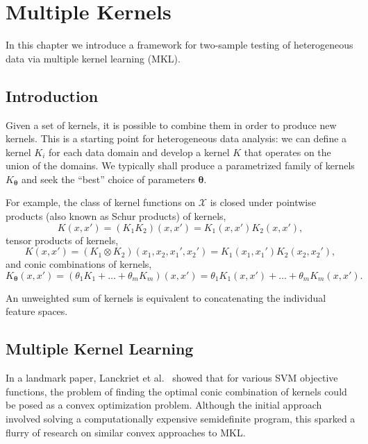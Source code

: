\graphicspath{{./MKL/img/}}
\chapter{Multiple Kernels}
\label{C:MKL}
In this chapter we introduce a framework for two-sample testing
of heterogeneous data via multiple kernel learning (MKL).

\section{Introduction}
Given a set of kernels, it is possible to combine them in order to produce new
kernels.  This is a starting point for heterogeneous data analysis: we
can define a kernel $K_i$ for each data domain and develop a kernel $K$ that operates
on the union of the domains.  We typically shall produce a parametrized
family of kernels $K_{{\boldsymbol \theta}}$ and seek the ``best'' choice of
parameters ${\boldsymbol \theta}$.

For example, the class of kernel functions on $\mathcal{X}$ is closed under pointwise products
(also known as Schur products) of kernels,
\begin{equation*}
  K(x,x') = (K_1K_2)(x,x')=K_1(x,x')K_2(x,x'),
\end{equation*}
tensor products of kernels,
\begin{equation*}
 K(x, x') = (K_1 \otimes  K_2)(x_1,x_2,x_1',x_2')=K_1(x_1,x_1')K_2(x_2,x_2'),
\end{equation*}
and conic combinations of kernels,
\begin{equation*}
  K_{{\boldsymbol \theta}}(x, x') = (\theta_1 K_1 + \ldots + \theta_m K_m)(x,x')=
  \theta_1 K_1(x,x') + \ldots + \theta_m K_m(x,x').
\end{equation*}

An unweighted sum of kernels is equivalent to concatenating the individual
feature spaces.

\section{Multiple Kernel Learning}
In a landmark paper, Lanckriet et al.\ \cite{lanckriet2004learning} showed
that for various SVM objective functions, the problem of finding the optimal
conic combination of kernels could be posed as a convex optimization problem.
Although the initial approach involved solving a computationally expensive
semidefinite program, this sparked a flurry of research on similar convex
approaches to MKL.


